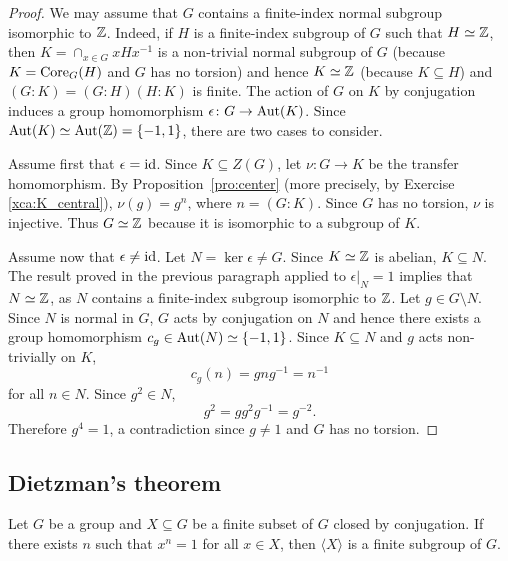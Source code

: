 \begin{proof}
	We may assume that $G$ contains a finite-index normal subgroup isomorphic to $\mathbb{Z}$. Indeed, 
	if $H$ is a finite-index subgroup of $G$ such that $H\simeq\mathbb{Z}$, then 
	$K=\cap_{x\in G}xHx^{-1}$ is a non-trivial normal subgroup of $G$ (because $K=\operatorname{Core}_G(H)$ and 
	$G$ has no torsion) and hence $K\simeq\mathbb{Z}$ (because  
	$K\subseteq H$) and $(G:K)=(G:H)(H:K)$ is finite.
	The action of $G$ on $K$ by conjugation induces a group homomorphism  
	$\epsilon\colon G\to\operatorname{Aut}(K)$. Since $\operatorname{Aut}(K)\simeq\operatorname{Aut}(\mathbb{Z})=\{-1,1\}$, 
	there are two cases to consider.
	
	Assume first that $\epsilon=\operatorname{id}$. Since $K\subseteq Z(G)$, let
	$\nu\colon G\to K$ be the transfer homomorphism. By
	Proposition~\ref{pro:center} (more precisely, 
	by Exercise \ref{xca:K_central}), $\nu(g)=g^n$, where $n=(G:K)$. Since
	$G$ has no torsion, $\nu$ is injective. Thus
	$G\simeq\mathbb{Z}$ because it is isomorphic to a subgroup of $K$.

	Assume now that $\epsilon\ne\operatorname{id}$. Let $N=\ker\epsilon\ne G$. Since
	$K\simeq\mathbb{Z}$ is abelian, $K\subseteq N$. The result proved in the previous paragraph 
	applied to $\epsilon|_N=1$ implies that $N\simeq\mathbb{Z}$, as 
	$N$ contains a finite-index subgroup isomorphic to $\mathbb{Z}$. Let $g\in G\setminus N$. 
	Since $N$ is normal in $G$, $G$ acts by conjugation on $N$ and hence 
	there exists a group homomorphism $c_g\in\operatorname{Aut}(N)\simeq\{-1,1\}$. Since
	$K\subseteq N$ and $g$ acts non-trivially on $K$, 
	\[
	c_g(n)=gng^{-1}=n^{-1}
	\]
	for all $n\in N$.  Since 
	$g^2\in N$, 
	\[
		g^2=gg^2g^{-1}=g^{-2}.
	\]
	Therefore $g^4=1$, a contradiction since $g\ne1$ and $G$ has no torsion.
\end{proof}

\subsection{Dietzman's theorem}

\begin{theorem}[Dietzmann]
	\label{thm:Dietzmann} 
	Let $G$ be a group and $X\subseteq G$ be a finite subset of $G$ closed by
	conjugation. If there exists $n$ such that $x^n=1$ for all $x\in X$, then
	$\langle X\rangle$ is a finite subgroup of $G$.
\end{theorem}

